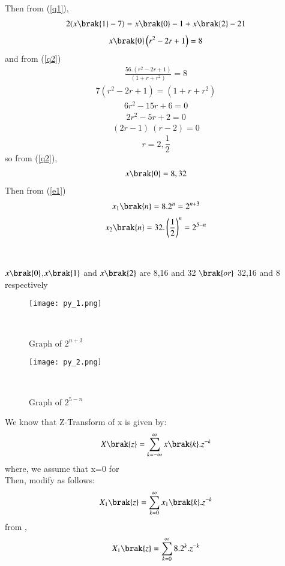 \documentclass[beamer]{IEEEtran}
\theoremstyle{remark}
\begin{document}
Then from (\ref{q1}),
\begin{align}2(x\brak{1}-7)=x\brak{0}-1+x\brak{2}-21\end{align}
\begin{align}x\brak{0}\left(r^2-2r+1\right)=8\end{align}
and from (\ref{q2})
\begin{align}\frac{56.\left(r^2-2r+1\right)}{\left(1+r+r^2\right)}=8\end{align}
\begin{align}7\left(r^2-2r+1\right)=\left(1+r+r^2\right)\end{align}
\begin{align}6r^2-15r+6=0\end{align}
\begin{align}2r^2-5r+2=0\end{align}
\begin{align}(2r-1)\ (r-2)=0\end{align}
\begin{equation}
\label{q3}
r=2,\frac{1}{2}
\end{equation}
so from (\ref{q2}),
\begin{align}x\brak{0}=8,32\end{align}
Then from (\ref{e1})
\begin{align}
    \label{a11}
    x_{1}\brak{n}=8.2^{n}=2^{n+3}
\end{align}
\begin{align}
    \label{a12}
    x_{2}\brak{n}=32.\left(\frac{1}{2}\right)^{n}=2^{5-n}
\end{align}\\\\
$x\brak{0}$,$x\brak{1}$ and $x\brak{2}$ are 8,16 and 32 $\brak{or}$ 32,16 and 8 respectively
\begin{figure}[h]
    \centering
    \texttt{[image: py\_1.png]}
    \label{fig:enter-label}
    \caption*{Graph of $2^{n+3}$ }\\
\end{figure}
\begin{figure}[h]
    \centering
    \texttt{[image: py\_2.png]}
    \caption*{Graph of $2^{5-n}$}\\
    \label{fig:enter-label}
\end{figure}
We know that Z-Transform of x is given by:
\begin{align}
\label{a13}
    X\brak{z}=\sum_{k=-\infty}^{\infty} x\brak{k}.z^{-k}
\end{align}
where, we assume that x=0   for \\
\brak{\ref{a13}} Then, modify as follows:
\begin{align}
\label{a14}
    X_1\brak{z}=\sum_{k=0}^{\infty} x_1\brak{k}.z^{-k}
\end{align}
from \brak{\ref{a11}},
\begin{align}X_1\brak{z}=\sum_{k=0}^{\infty} 8.2^k.z^{-k}\end{align}
\end{document}
